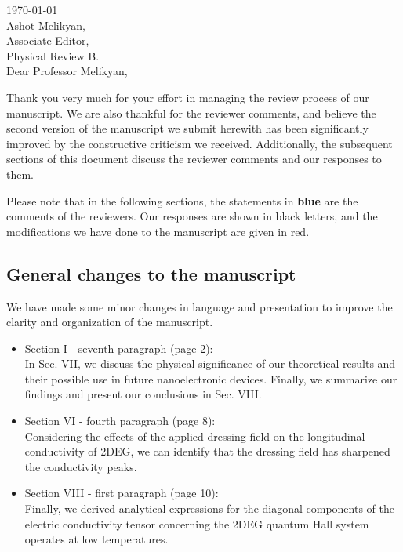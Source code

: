 \documentclass{article}
\begin{document}

\today\\

Ashot Melikyan,\\
Associate Editor,\\
Physical Review B.\\

Dear Professor Melikyan,

Thank you very much for your effort in managing the review process of our manuscript. We are also thankful for the reviewer comments, and believe the second version of the manuscript we submit herewith has been significantly improved by the constructive criticism we received. Additionally, the subsequent sections of this document discuss the reviewer comments and our responses to them.

Please note that in the following sections, the statements in {\color{RoyalBlue} \textbf{blue}} are the comments of the reviewers. Our responses are shown in black letters, and the modifications we have done to the manuscript are given in {\color{Red} red}.

\subsection*{General changes to the manuscript}


We have made some minor changes in language and presentation to improve the clarity and organization of the manuscript.
\begin{itemize}
    \item Section I - seventh paragraph (page 2): \\
        {\color{Red} In Sec. VII, we discuss the physical significance of our theoretical results and their possible use in future nanoelectronic devices.
        Finally, we summarize our findings and present our conclusions in Sec. VIII.}
    \item Section VI - fourth paragraph (page 8): \\
        {\color{Red} Considering the effects of the applied dressing field on the longitudinal conductivity of 2DEG, we can identify that the dressing field has sharpened the conductivity peaks.}
    \item Section VIII - first paragraph (page 10): \\
        {\color{Red} Finally, we derived analytical expressions for the diagonal components of the electric conductivity tensor concerning the 2DEG quantum Hall system operates at low temperatures.}
\end{itemize}
\end{document}
